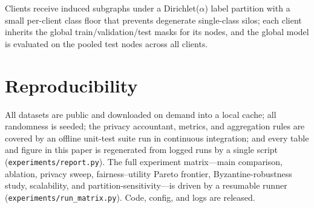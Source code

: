 \begin{appendices}
Clients receive induced subgraphs under a Dirichlet($\alpha$) label partition
with a small per-client class floor that prevents degenerate single-class silos;
each client inherits the global train/validation/test masks for its nodes, and
the global model is evaluated on the pooled test nodes across all clients.

\section{Reproducibility}
\label{app:repro}
All datasets are public and downloaded on demand into a local cache; all
randomness is seeded; the privacy accountant, metrics, and aggregation rules are
covered by an offline unit-test suite run in continuous integration; and every
table and figure in this paper is regenerated from logged runs by a single
script (\texttt{experiments/report.py}). The full experiment matrix---main
comparison, ablation, privacy sweep, fairness--utility Pareto frontier,
Byzantine-robustness study, scalability, and partition-sensitivity---is driven
by a resumable runner (\texttt{experiments/run\_matrix.py}). Code, config, and
logs are released.

\end{appendices}
